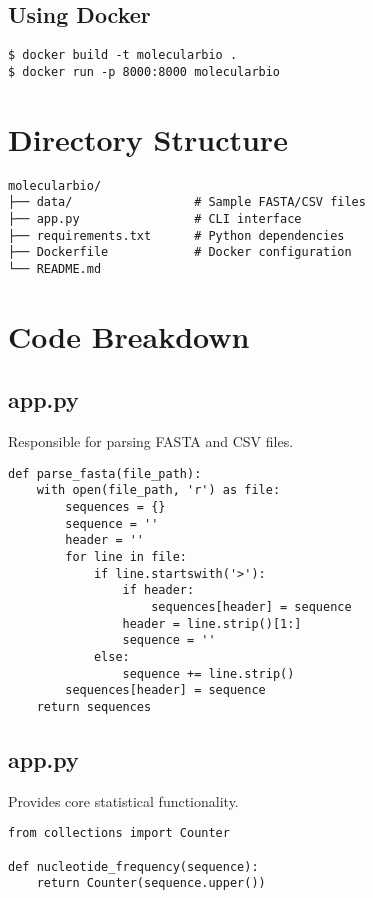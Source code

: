 \documentclass[11pt,a4paper]{article}
\begin{document}
\subsection{Using Docker}

\begin{verbatim}
$ docker build -t molecularbio .
$ docker run -p 8000:8000 molecularbio
\end{verbatim}

\section{Directory Structure}

\begin{verbatim}
molecularbio/
├── data/                 # Sample FASTA/CSV files
├── app.py                # CLI interface
├── requirements.txt      # Python dependencies
├── Dockerfile            # Docker configuration
└── README.md
\end{verbatim}

\section{Code Breakdown}

\subsection{app.py}
Responsible for parsing FASTA and CSV files.

\begin{lstlisting}[style=python, caption={Sample FASTA Parsing Code}]
def parse_fasta(file_path):
    with open(file_path, 'r') as file:
        sequences = {}
        sequence = ''
        header = ''
        for line in file:
            if line.startswith('>'):
                if header:
                    sequences[header] = sequence
                header = line.strip()[1:]
                sequence = ''
            else:
                sequence += line.strip()
        sequences[header] = sequence
    return sequences
\end{lstlisting}

\subsection{app.py}
Provides core statistical functionality.

\begin{lstlisting}[style=python, caption={Basic Nucleotide Frequency}]
from collections import Counter

def nucleotide_frequency(sequence):
    return Counter(sequence.upper())
\end{lstlisting}
\end{document}
